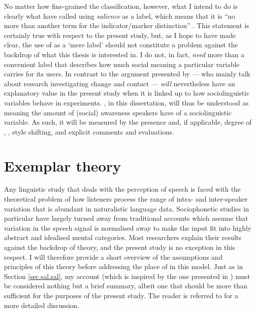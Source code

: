 No matter how fine-grained the classification, however, what I intend to do is clearly what \textcite{kerswillwilliams2002} have called using \emph{salience} as a label, which means that it is ``no more than another term for the indicator/marker distinction'' \parencite[32]{racz2013}.
This statement is certainly true with respect to the present study, but, as I hope to have made clear, the use of  as a `mere label' should not constitute a problem against the backdrop of what this thesis is interested in.
I do not, in fact, \emph{need} more than a convenient label that describes how much social meaning a particular variable carries for its users.
In contrast to the argument presented by \textcite{kerswillwilliams2002} --- who mainly talk about research investigating change and contact ---  \emph{will} nevertheless have an explanatory value in the present study when it is linked up to how sociolinguistic variables behave in  experiments.
, in this dissertation, will thus be understood as meaning the amount of (social) awareness speakers have of a sociolinguistic variable.
As such, it will be measured by the presence and, if applicable, degree of , , style shifting, and explicit comments and evaluations.

	\section{Exemplar theory}
	\label{sec.sal.exemplar}

Any linguistic study that deals with the perception of speech is faced with the theoretical problem of how listeners process the range of intra- and inter-speaker variation that is abundant in naturalistic language data.
Sociophonetic studies in particular have largely turned away from traditional accounts which assume that variation in the speech signal is normalised away to make the input fit into highly abstract and idealised mental categories.
Most researchers explain their results against the backdrop of  theory, and the present study is no exception in this respect.
I will therefore provide a short overview of the assumptions and principles of this theory before addressing the place of  in this model.
Just as in Section \ref{sec.sal.sal}, my account (which is inspired by the one presented in \citealt{juskanma}) must be considered nothing but a brief summary, albeit one that should be more than sufficient for the purposes of the present study.
The reader is referred to \citealt{pierrehumbert2006} for a more detailed discussion.

